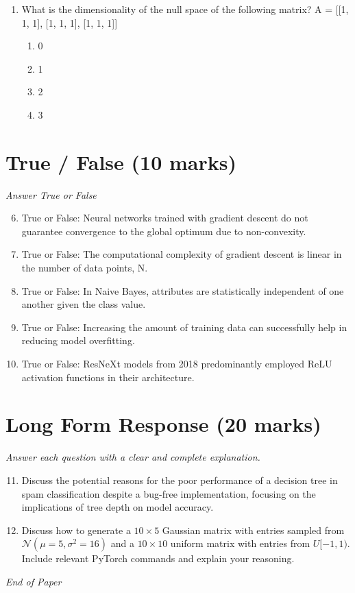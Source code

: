 \documentclass[12pt]{article}
\begin{document}
\begin{enumerate}[label=\arabic*.]
\begin{enumerate}[label=(\alph*)]
    \item O(log N )
    \item O( $N^2$ )
\end{enumerate}
\item What is the dimensionality of the null space of the following matrix? A = [[1, 1, 1], [1, 1, 1], [1, 1, 1]]
\begin{enumerate}[label=(\alph*)]
    \item 0
    \item 1
    \item 2
    \item 3
\end{enumerate}
\end{enumerate}

\section*{True / False (10 marks)}
\textit{Answer True or False}
\begin{enumerate}[label=\arabic*.]
\setcounter{enumi}{5}
\item True or False: Neural networks trained with gradient descent do not guarantee convergence to the global optimum due to non-convexity.
\item True or False: The computational complexity of gradient descent is linear in the number of data points, N.
\item True or False: In Naive Bayes, attributes are statistically independent of one another given the class value.
\item True or False: Increasing the amount of training data can successfully help in reducing model overfitting.
\item True or False: ResNeXt models from 2018 predominantly employed ReLU activation functions in their architecture.
\end{enumerate}

\section*{Long Form Response (20 marks)}
\textit{Answer each question with a clear and complete explanation.}
\begin{enumerate}[label=\arabic*.]
\setcounter{enumi}{10}
\item Discuss the potential reasons for the poor performance of a decision tree in spam classification despite a bug-free implementation, focusing on the implications of tree depth on model accuracy.
\item Discuss how to generate a $10\times 5$ Gaussian matrix with entries sampled from $\mathcal{N}(\mu=5,\sigma^2=16)$ and a $10\times 10$ uniform matrix with entries from $U[-1,1)$. Include relevant PyTorch commands and explain your reasoning.
\end{enumerate}

\vfill
\noindent\textit{End of Paper}
\end{document}
